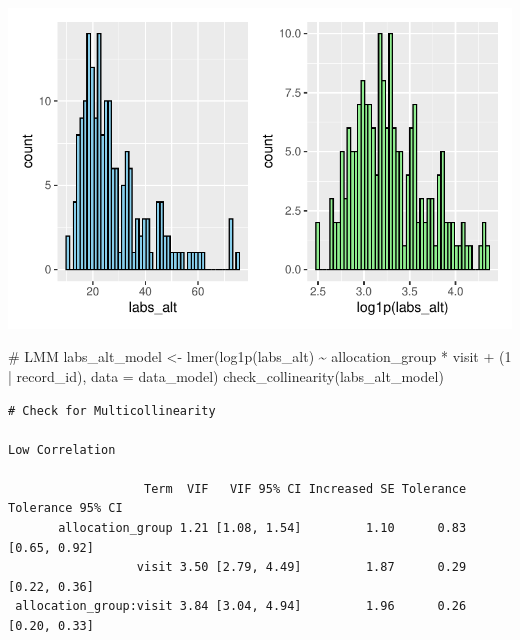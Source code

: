 \documentclass[
  12pt,
]{article}
\newenvironment{Shaded}{\begin{snugshade}}{\end{snugshade}}
\newcommand{\AttributeTok}[1]{\textcolor[rgb]{0.40,0.45,0.13}{#1}}
\newcommand{\CommentTok}[1]{\textcolor[rgb]{0.37,0.37,0.37}{#1}}
\newcommand{\DecValTok}[1]{\textcolor[rgb]{0.68,0.00,0.00}{#1}}
\newcommand{\FunctionTok}[1]{\textcolor[rgb]{0.28,0.35,0.67}{#1}}
\newcommand{\NormalTok}[1]{\textcolor[rgb]{0.00,0.23,0.31}{#1}}
\newcommand{\OtherTok}[1]{\textcolor[rgb]{0.00,0.23,0.31}{#1}}
\newcommand{\SpecialCharTok}[1]{\textcolor[rgb]{0.37,0.37,0.37}{#1}}
\newcommand{\StringTok}[1]{\textcolor[rgb]{0.13,0.47,0.30}{#1}}
\begin{document}
\includegraphics{Outcomes_files/figure-pdf/labs_alt_1-1.pdf}

\begin{Shaded}
\begin{Highlighting}[]
\CommentTok{\# LMM}
\NormalTok{labs\_alt\_model }\OtherTok{\textless{}{-}} \FunctionTok{lmer}\NormalTok{(}\FunctionTok{log1p}\NormalTok{(labs\_alt) }\SpecialCharTok{\textasciitilde{}}\NormalTok{ allocation\_group }\SpecialCharTok{*}\NormalTok{ visit }\SpecialCharTok{+} 
\NormalTok{(}\DecValTok{1} \SpecialCharTok{|}\NormalTok{ record\_id), }\AttributeTok{data =}\NormalTok{ data\_model)}
\FunctionTok{check\_collinearity}\NormalTok{(labs\_alt\_model)}
\end{Highlighting}
\end{Shaded}

\begin{verbatim}
# Check for Multicollinearity

Low Correlation

                   Term  VIF   VIF 95% CI Increased SE Tolerance Tolerance 95% CI
       allocation_group 1.21 [1.08, 1.54]         1.10      0.83     [0.65, 0.92]
                  visit 3.50 [2.79, 4.49]         1.87      0.29     [0.22, 0.36]
 allocation_group:visit 3.84 [3.04, 4.94]         1.96      0.26     [0.20, 0.33]
\end{verbatim}

\begin{Shaded}
\end{Shaded}
\end{document}
